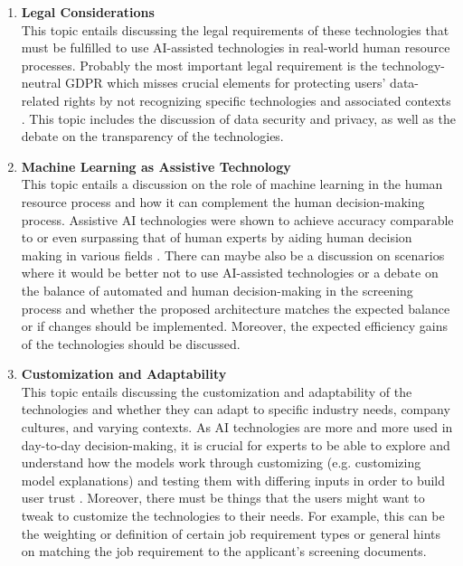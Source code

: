 \documentclass[draft,final]{thesisclass} %
\begin{document}
\begin{enumerate}
\begin{enumerate}
        \item \textbf{Legal Considerations} \parencite{ai_transparency_legal_norms}\\
        This topic entails discussing the legal requirements of these technologies that must be fulfilled to use \acs{AI}-assisted technologies in real-world human resource processes. Probably the most important legal requirement is the technology-neutral \acs{GDPR} which misses crucial elements for protecting users' data-related rights by not recognizing specific technologies and associated contexts \parencite[4]{ai_transparency_legal_norms}.
        This topic includes the discussion of data security and privacy, as well as the debate on the transparency of the technologies.
        \item \textbf{Machine Learning as Assistive Technology} \parencite{assistive_ai_systems}\\
        This topic entails a discussion on the role of machine learning in the human resource process and how it can complement the human decision-making process.
        Assistive \acs{AI} technologies were shown to achieve accuracy comparable to or even surpassing that of human experts by aiding human decision making in various fields \parencite[1]{assistive_ai_systems}.
        There can maybe also be a discussion on scenarios where it would be better not to use \acs{AI}-assisted technologies or a debate on the balance of automated and human decision-making in the screening process and whether the proposed architecture matches the expected balance or if changes should be implemented.
        Moreover, the expected efficiency gains of the technologies should be discussed.
        \item \textbf{Customization and Adaptability} \parencite{customizable_explanations}\\
        This topic entails discussing the customization and adaptability of the technologies and whether they can adapt to specific industry needs, company cultures, and varying contexts.
        As \acs{AI} technologies are more and more used in day-to-day decision-making, it is crucial for experts to be able to explore and understand how the models work through customizing (e.g. customizing model explanations) and testing them with differing inputs in order to build user trust \parencite[1]{customizable_explanations}.
        Moreover, there must be things that the users might want to tweak to customize the technologies to their needs.
        For example, this can be the weighting or definition of certain job requirement types or general hints on matching the job requirement to the applicant's screening documents.

\end{enumerate}
\end{enumerate}
\end{document}
